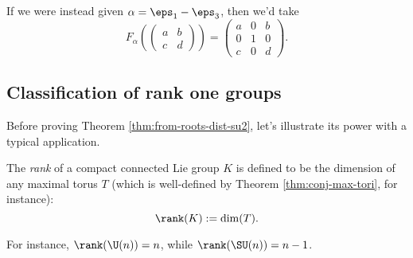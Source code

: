 \documentclass[reqno]{amsart} 
\begin{document}
If we were instead given $\alpha = \eps_{1} - \eps_3$, then we'd take
\begin{equation*}
  F_\alpha (
\begin{pmatrix}
    a & b \\
    c & d
  \end{pmatrix}
) = 
\begin{pmatrix}
    a & 0 & b \\
    0 & 1 & 0 \\
    c & 0 & d
  \end{pmatrix}
.
\end{equation*}

\subsection{Classification of rank one groups}\label{sec:cnh2vouzjh}
Before proving Theorem \ref{thm:from-roots-dist-su2}, let's illustrate its power with a typical application.
\begin{definition}
  The \emph{rank} of a compact connected Lie group $K$ is defined to be the dimension of any maximal torus $T$ (which is well-defined by Theorem \ref{thm:conj-max-tori}, for instance):
  \begin{equation*}
    \rank(K) := \dim(T).
  \end{equation*}
\end{definition}
For instance, $\rank(\U(n)) = n$, while $\rank(\SU(n)) = n-1$.
\end{document}
